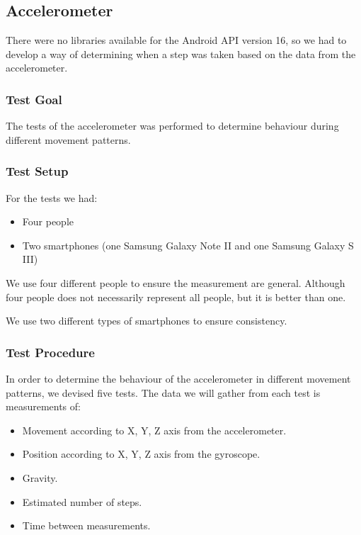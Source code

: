 \subsection{Accelerometer}
There were no libraries available for the Android API version 16, so we had to develop a way of determining when a step was taken based on the data from the accelerometer.

\subsubsection{Test Goal}
The tests of the accelerometer was performed to determine behaviour during different movement patterns. 

\subsubsection{Test Setup}
For the tests we had:
\begin{itemize}
\item Four people
\item Two smartphones (one Samsung Galaxy Note II and one Samsung Galaxy S III)
\end{itemize}

We use four different people to ensure the measurement are general.
Although four people does not necessarily represent all people, but it is better than one.

We use two different types of smartphones to ensure consistency.

\subsubsection{Test Procedure}
In order to determine the behaviour of the accelerometer in different movement patterns, we devised five tests.
The data we will gather from each test is measurements of:
\begin{itemize}
\item Movement according to X, Y, Z axis from the accelerometer.
\item Position according to X, Y, Z axis from the gyroscope.
\item Gravity.
\item Estimated number of steps.
\item Time between measurements.
\end{itemize}

